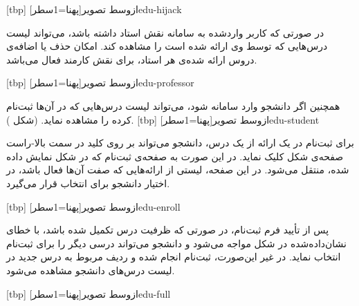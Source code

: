 [tbp]
‌ازوسط
‌تصویر[پهنا=1‌سطر]{edu-hijack}

در صورتی که کاربر واردشده به سامانه نقش استاد داشته باشد، می‌تواند
لیست درس‌هایی که توسط وی ارائه شده است را مشاهده کند. امکان حذف یا
اضافه‌ی دروس ارائه شده‌ی هر استاد، برای نقش کارمند فعال می‌باشد.

[tbp]
‌ازوسط
‌تصویر[پهنا=1‌سطر]{edu-professor}

همچنین اگر دانشجو وارد سامانه شود، می‌تواند لیست درس‌هایی که در آن‌ها
ثبت‌نام کرده را مشاهده نماید. (شکل ).
[tbp]
‌ازوسط
‌تصویر[پهنا=1‌سطر]{edu-student}

برای ثبت‌نام در یک ارائه از یک درس، دانشجو می‌تواند بر روی کلید در سمت
بالا-راست صفحه‌ی شکل  کلیک نماید. در این صورت به
صفحه‌ی ثبت‌نام که در شکل  نمایش داده شده، منتقل
می‌شود. در این صفحه، لیستی از ارائه‌هایی که صفت  آن‌ها
فعال باشد، در اختیار دانشجو برای انتخاب قرار می‌گیرد.

[tbp]
‌ازوسط
‌تصویر[پهنا=1‌سطر]{edu-enroll}

پس از تأیید فرم ثبت‌نام، در صورتی که ظرفیت درس تکمیل شده باشد، با خطای
نشان‌داده‌شده در شکل  مواجه می‌شود و دانشجو می‌تواند
درسی دیگر را برای ثبت‌نام انتخاب نماید. در غیر این‌صورت، ثبت‌نام انجام
شده و ردیف مربوط به درس جدید در لیست درس‌های دانشجو مشاهده می‌شود.

[tbp]
‌ازوسط
‌تصویر[پهنا=1‌سطر]{edu-full}

                                                                    



